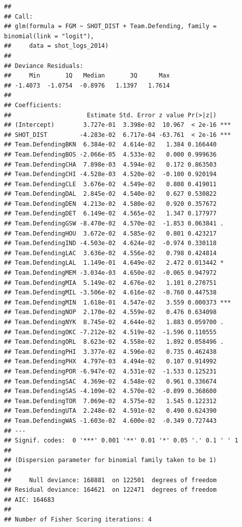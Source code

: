 \documentclass[
]{book}
\theoremstyle{definition}
\theoremstyle{definition}
\theoremstyle{definition}
\theoremstyle{definition}
\theoremstyle{remark}
\begin{document}
\begin{verbatim}
## 
## Call:
## glm(formula = FGM ~ SHOT_DIST + Team.Defending, family = binomial(link = "logit"), 
##     data = shot_logs_2014)
## 
## Deviance Residuals: 
##     Min       1Q   Median       3Q      Max  
## -1.4073  -1.0754  -0.8976   1.1397   1.7614  
## 
## Coefficients:
##                     Estimate Std. Error z value Pr(>|z|)    
## (Intercept)        3.727e-01  3.398e-02  10.967  < 2e-16 ***
## SHOT_DIST         -4.283e-02  6.717e-04 -63.761  < 2e-16 ***
## Team.DefendingBKN  6.384e-02  4.614e-02   1.384 0.166440    
## Team.DefendingBOS -2.066e-05  4.533e-02   0.000 0.999636    
## Team.DefendingCHA  7.898e-03  4.594e-02   0.172 0.863503    
## Team.DefendingCHI -4.528e-03  4.520e-02  -0.100 0.920194    
## Team.DefendingCLE  3.676e-02  4.549e-02   0.808 0.419011    
## Team.DefendingDAL  2.845e-02  4.540e-02   0.627 0.530822    
## Team.DefendingDEN  4.213e-02  4.580e-02   0.920 0.357672    
## Team.DefendingDET  6.149e-02  4.565e-02   1.347 0.177977    
## Team.DefendingGSW -8.470e-02  4.570e-02  -1.853 0.063841 .  
## Team.DefendingHOU  3.672e-02  4.585e-02   0.801 0.423217    
## Team.DefendingIND -4.503e-02  4.624e-02  -0.974 0.330118    
## Team.DefendingLAC  3.636e-02  4.556e-02   0.798 0.424814    
## Team.DefendingLAL  1.149e-01  4.649e-02   2.472 0.013442 *  
## Team.DefendingMEM -3.034e-03  4.650e-02  -0.065 0.947972    
## Team.DefendingMIA  5.149e-02  4.676e-02   1.101 0.270751    
## Team.DefendingMIL -3.506e-02  4.616e-02  -0.760 0.447538    
## Team.DefendingMIN  1.618e-01  4.547e-02   3.559 0.000373 ***
## Team.DefendingNOP  2.170e-02  4.559e-02   0.476 0.634098    
## Team.DefendingNYK  8.745e-02  4.644e-02   1.883 0.059700 .  
## Team.DefendingOKC -7.212e-02  4.519e-02  -1.596 0.110555    
## Team.DefendingORL  8.623e-02  4.558e-02   1.892 0.058496 .  
## Team.DefendingPHI  3.377e-02  4.596e-02   0.735 0.462438    
## Team.DefendingPHX  4.797e-03  4.494e-02   0.107 0.914992    
## Team.DefendingPOR -6.947e-02  4.531e-02  -1.533 0.125231    
## Team.DefendingSAC  4.369e-02  4.548e-02   0.961 0.336674    
## Team.DefendingSAS -4.109e-02  4.570e-02  -0.899 0.368600    
## Team.DefendingTOR  7.069e-02  4.575e-02   1.545 0.122312    
## Team.DefendingUTA  2.248e-02  4.591e-02   0.490 0.624390    
## Team.DefendingWAS -1.603e-02  4.600e-02  -0.349 0.727443    
## ---
## Signif. codes:  0 '***' 0.001 '**' 0.01 '*' 0.05 '.' 0.1 ' ' 1
## 
## (Dispersion parameter for binomial family taken to be 1)
## 
##     Null deviance: 168881  on 122501  degrees of freedom
## Residual deviance: 164621  on 122471  degrees of freedom
## AIC: 164683
## 
## Number of Fisher Scoring iterations: 4
\end{verbatim}
\end{document}
